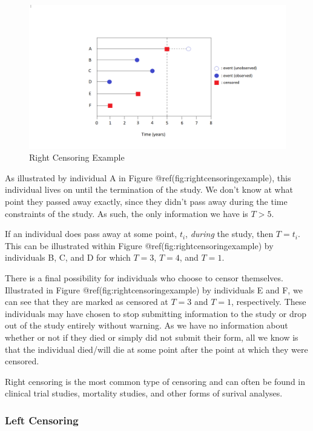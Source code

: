 \documentclass[
]{article}
\begin{document}
\begin{figure}
\includegraphics[width=1\linewidth]{figures/right_censoring_example} \caption{Right Censoring Example}\label{fig:rightcensoringexample}
\end{figure}

As illustrated by individual A in Figure
@ref(fig:rightcensoringexample), this individual lives on until the
termination of the study. We don't know at what point they passed away
exactly, since they didn't pass away during the time constraints of the
study. As such, the only information we have is \(T > 5\).

If an individual does pass away at some point, \(t_i\), \emph{during}
the study, then \(T = t_i\). This can be illustrated within Figure
@ref(fig:rightcensoringexample) by individuals B, C, and D for which
\(T = 3\), \(T = 4\), and \(T = 1\).

There is a final possibility for individuals who choose to censor
themselves. Illustrated in Figure @ref(fig:rightcensoringexample) by
individuals E and F, we can see that they are marked as censored at
\(T = 3\) and \(T = 1\), respectively. These individuals may have chosen
to stop submitting information to the study or drop out of the study
entirely without warning. As we have no information about whether or not
if they died or simply did not submit their form, all we know is that
the individual died/will die at some point after the point at which they
were censored.

Right censoring is the most common type of censoring and can often be
found in clinical trial studies, mortality studies, and other forms of
surival analyses.

\hypertarget{left}{%
\subsubsection{Left Censoring}\label{left}}
\end{document}
